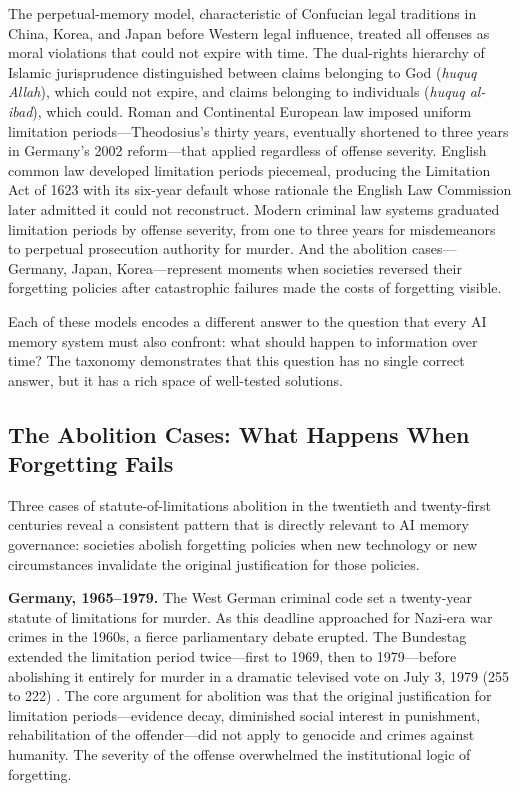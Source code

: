\documentclass[12pt]{article}
\begin{document}
The perpetual-memory model, characteristic of Confucian legal traditions in China, Korea, and Japan before Western legal influence, treated all offenses as moral violations that could not expire with time. The dual-rights hierarchy of Islamic jurisprudence distinguished between claims belonging to God (\emph{huquq Allah}), which could not expire, and claims belonging to individuals (\emph{huquq al-ibad}), which could. Roman and Continental European law imposed uniform limitation periods---Theodosius's thirty years, eventually shortened to three years in Germany's 2002 reform---that applied regardless of offense severity. English common law developed limitation periods piecemeal, producing the Limitation Act of 1623 \citep{limitation-act-1623} with its six-year default whose rationale the English Law Commission later admitted it could not reconstruct. Modern criminal law systems graduated limitation periods by offense severity, from one to three years for misdemeanors to perpetual prosecution authority for murder. And the abolition cases---Germany, Japan, Korea---represent moments when societies reversed their forgetting policies after catastrophic failures made the costs of forgetting visible.

Each of these models encodes a different answer to the question that every AI memory system must also confront: what should happen to information over time? The taxonomy demonstrates that this question has no single correct answer, but it has a rich space of well-tested solutions.

\subsection{The Abolition Cases: What Happens When Forgetting Fails}
\label{sec:abolition-cases}

Three cases of statute-of-limitations abolition in the twentieth and twenty-first centuries reveal a consistent pattern that is directly relevant to AI memory governance: societies abolish forgetting policies when new technology or new circumstances invalidate the original justification for those policies.

\textbf{Germany, 1965--1979.} The West German criminal code set a twenty-year statute of limitations for murder. As this deadline approached for Nazi-era war crimes in the 1960s, a fierce parliamentary debate erupted. The Bundestag extended the limitation period twice---first to 1969, then to 1979---before abolishing it entirely for murder in a dramatic televised vote on July 3, 1979 (255 to 222) \citep{german-verjaehrung}. The core argument for abolition was that the original justification for limitation periods---evidence decay, diminished social interest in punishment, rehabilitation of the offender---did not apply to genocide and crimes against humanity. The severity of the offense overwhelmed the institutional logic of forgetting.
\end{document}
